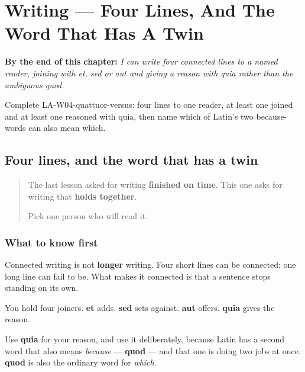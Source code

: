 
\chapter{Writing --- Four Lines, And The Word That Has A Twin}
\label{ch:la-quattuor-versus}

\begin{chapteropening}
\textbf{By the end of this chapter:} \emph{I can write four connected lines to a named reader, joining with et, sed or aut and giving a reason with quia rather than the ambiguous quod.}

Complete LA-W04-quattuor-versus: four lines to one reader, at least one joined and at least one reasoned with quia, then name which of Latin's two because-words can also mean which.
\end{chapteropening}

\section[quia]{Four lines, and the word that has a twin}

\label{lesson:LA-W04-quattuor-versus}



\begin{quote}
The last lesson asked for writing \textbf{finished on time}. This one asks for writing that \textbf{holds together}.

Pick one person who will read it.
\end{quote}

\subsection*{What to know first}
Connected writing is not \textbf{longer} writing. Four short lines can be connected; one long line can fail to be. What makes it connected is that a sentence stops standing on its own.

You hold four joiners. \textbf{et} adds. \textbf{sed} sets against. \textbf{aut} offers. \textbf{quia} gives the reason.

Use \textbf{quia} for your reason, and use it deliberately, because Latin has a second word that also means \emph{because} — \textbf{quod} — and that one is doing two jobs at once. \textbf{quod} is also the ordinary word for \emph{which}.

